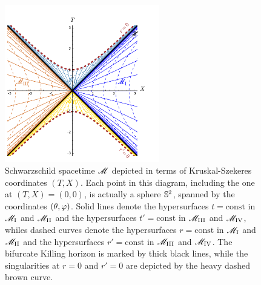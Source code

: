 \begin{figure}
\centerline{\includegraphics[width=0.6\textwidth]{sch_kruskal_diag.pdf}}
\caption[]{\label{f:sch:kruskal_diag} \footnotesize
Schwarzschild spacetime $\mathscr{M}$ depicted in terms of Kruskal-Szekeres coordinates $(T,X)$.
Each point in this diagram, including the one at $(T,X)=(0,0)$,
is actually a sphere $\mathbb{S}^2$, spanned by the
coordinates $(\theta,\varphi)$.
Solid lines denote the hypersurfaces $t=\mathrm{const}$ in $\mathscr{M}_{\rm I}$ and
$\mathscr{M}_{\rm II}$ and the  hypersurfaces $t'=\mathrm{const}$ in $\mathscr{M}_{\rm III}$ and
$\mathscr{M}_{\rm IV}$, whiles dashed curves
denote the hypersurfaces $r=\mathrm{const}$ in $\mathscr{M}_{\rm I}$ and
$\mathscr{M}_{\rm II}$ and the  hypersurfaces $r'=\mathrm{const}$ in $\mathscr{M}_{\rm III}$ and
$\mathscr{M}_{\rm IV}$.
The bifurcate Killing horizon is marked by thick black lines, while the
singularities at $r=0$ and $r'=0$ are depicted by the heavy dashed brown curve.}
\end{figure}

